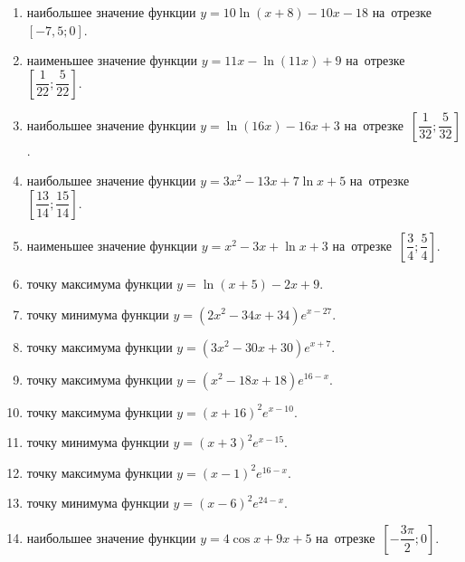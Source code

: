 \documentclass[a4paper,10pt]{article}
\begin{document}
\begin{enumerate}
\item {} наибольшее значение функции $y = 10\ln \left(x+8\right)-10x -18$ на~отрезке~$\left[-7,5;0\right]$.

\item {} наименьшее значение функции $y = 11x-\ln \left(11x\right)+9$ на~отрезке~$\left[\dfrac{1}{22};\dfrac{5}{22}\right]$.

\item {} наибольшее значение функции $y = \ln \left(16x\right)-16x+3$ на~отрезке~$\left[\dfrac{1}{32};\dfrac{5}{32}\right]$.

\item {} наибольшее значение функции $y=3x^2-13x+7\ln x+5$ на~отрезке~$\left[\dfrac{13}{14};\dfrac{15}{14}\right]$.

\item {} наименьшее значение функции $y=x^2-3x+\ln x+3$ на~отрезке~$\left[\dfrac{3}{4};\dfrac{5}{4}\right]$.

\item {} точку максимума функции $y=\ln \left(x+5\right)-2x+9$.







\item {} точку минимума функции $y=\left(2x^2-34x+34\right)e^{x-27}$.

\item {} точку максимума функции $y=\left(3x^2-30x+30\right)e^{x+7}$.

\item {} точку максимума функции $y=\left(x^2-18x+18\right)e^{16-x}$.

\item {} точку максимума функции $y=\left(x +16\right)^2e^{x-10}$.

\item {} точку минимума функции $y=\left(x +3\right)^2e^{x-15}$.

\item {} точку максимума функции $y=\left(x -1\right)^2e^{16-x}$.

\item {} точку минимума функции $y=\left(x -6\right)^2e^{24-x}$.

\item {} наибольшее значение функции $y=4\cos x+9x +5$ на~отрезке~$\left[-\dfrac{3\pi }{2};0\right]$.


\end{enumerate}
\end{document}
